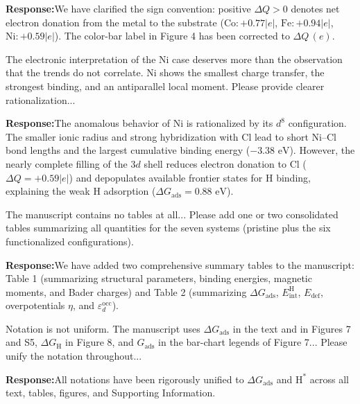 \documentclass[11pt, sans, a4paper]{moderncv}
\newcommand{\response}{\vspace{0.4em}\noindent\textbf{\color{actionblue}Response:}\hspace{0.5em}}
\begin{document}
\response We have clarified the sign convention: positive $\Delta Q > 0$ denotes net electron donation from the metal to the substrate ($\text{Co}: +0.77|e|$, $\text{Fe}: +0.94|e|$, $\text{Ni}: +0.59|e|$). The color-bar label in Figure 4 has been corrected to $\Delta Q\,(e)$.

\begin{reviewercomment}
The electronic interpretation of the Ni case deserves more than the observation that the trends do not correlate. Ni shows the smallest charge transfer, the strongest binding, and an antiparallel local moment. Please provide clearer rationalization...
\end{reviewercomment}

\response The anomalous behavior of Ni is rationalized by its $d^8$ configuration. The smaller ionic radius and strong hybridization with Cl lead to short $\text{Ni--Cl}$ bond lengths and the largest cumulative binding energy ($-3.38\text{ eV}$). However, the nearly complete filling of the $3d$ shell reduces electron donation to Cl ($\Delta Q = +0.59|e|$) and depopulates available frontier states for H binding, explaining the weak H adsorption ($\Delta G_{\mathrm{ads}} = 0.88\text{ eV}$).

\begin{reviewercomment}
The manuscript contains no tables at all... Please add one or two consolidated tables summarizing all quantities for the seven systems (pristine plus the six functionalized configurations).
\end{reviewercomment}

\response We have added two comprehensive summary tables to the manuscript: Table 1 (summarizing structural parameters, binding energies, magnetic moments, and Bader charges) and Table 2 (summarizing $\Delta G_{\mathrm{ads}}$, $E_{\mathrm{int}}^{\mathrm{H}}$, $E_{\mathrm{def}}$, overpotentials $\eta$, and $\varepsilon_d^{\mathrm{occ}}$).

\begin{reviewercomment}
Notation is not uniform. The manuscript uses $\Delta G_{\mathrm{ads}}$ in the text and in Figures 7 and S5, $\Delta G_{\mathrm{H}}$ in Figure 8, and $G_{\mathrm{ads}}$ in the bar-chart legends of Figure 7... Please unify the notation throughout...
\end{reviewercomment}

\response All notations have been rigorously unified to $\Delta G_{\mathrm{ads}}$ and $\mathrm{H}^*$ across all text, tables, figures, and Supporting Information.
\end{document}
